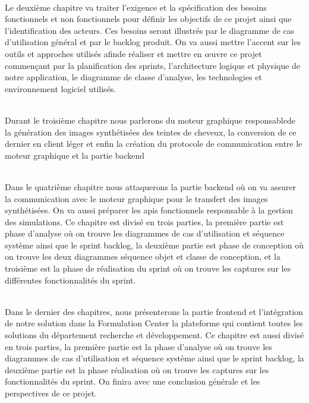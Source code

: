 \\Le deuxième chapitre va traiter l’exigence et la spécification des besoins fonctionnels et non fonctionnels pour définir les objectifs de ce projet ainsi que l’identification des acteurs. Ces besoins seront illustrés par le diagramme de cas d’utilisation général et par le backlog produit. On va aussi mettre l’accent sur les outils et approches utilisés afinde réaliser et mettre en œuvre ce projet commençant par la planification des sprints, l’architecture logique et physique de notre application, le diagramme de classe d’analyse, les technologies et environnement logiciel utilisés.

\\Durant le troisième chapitre nous parlerons du moteur graphique responsablede la génération des images synthétisées des teintes de cheveux, la conversion de ce dernier en client léger et enfin la création du protocole de communication entre le moteur graphique et la partie backend

\newpage
\\Dans  le  quatrième  chapitre  nous  attaquerons  la  partie  backend  où  on  va  assurer  la  communication  avec  le  moteur  graphique  pour  le  transfert  des  images  synthétisées.  On  va  aussi  préparer  les  apis  fonctionnels  responsable  à  la  gestion  des  simulations.    Ce  chapitre  est  divisé  en  trois  parties,  la  première  partie  est  phase  d’analyse  où  on  trouve  les  diagrammes  de  cas  d’utilisation  et  séquence  système  ainsi  que  le  sprint  backlog,  la  deuxième  partie  est  phase  de  conception  où  on  trouve  les  deux  diagrammes  séquence  objet  et  classe  de  conception,  et  la  troisième  est  la  phase  de  réalisation  du  sprint  où  on  trouve  les  captures  sur  les  différentes  fonctionnalités  du  sprint.

\\Dans  le  dernier  des  chapitres,  nous  présenterons  la  partie  frontend  et  l’intégration  de  notre  solution  dans  la  Formulation  Center  la  plateforme  qui  contient  toutes  les  solutions  du  département  recherche  et  développement.
Ce  chapitre  est  aussi  divisé  en  trois  parties,  la  première  partie  est  la  phase  d’analyse  où  on  trouve  les  diagrammes  de  cas  d’utilisation  et  séquence  système  ainsi  que  le  sprint  backlog,  la  deuxième  partie  est  la  phase  réalisation  où  on  trouve  les  captures  sur  les  fonctionnalités  du  sprint.
On  finira  avec  une  conclusion  générale  et  les  perspectives  de  ce  projet.
